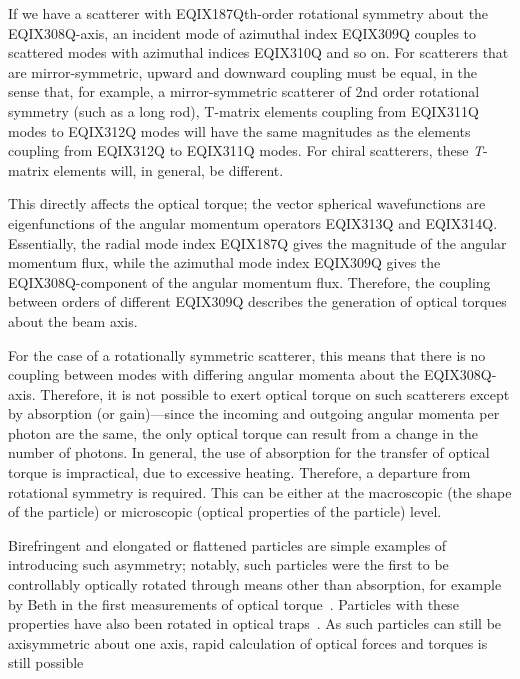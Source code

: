 If we have a scatterer with EQIX187Qth-order rotational symmetry about the
EQIX308Q-axis, an incident mode of azimuthal index EQIX309Q couples to scattered
modes with azimuthal indices EQIX310Q and so on. For
scatterers that are mirror-symmetric, upward and downward coupling must be
equal, in the sense that, for example, a mirror-symmetric scatterer of
2nd order rotational symmetry (such as a long rod), {T}-matrix elements
coupling from EQIX311Q modes to EQIX312Q modes will have the same magnitudes
as the elements coupling from EQIX312Q to EQIX311Q modes. For chiral
scatterers, these \textit{T}-matrix elements will, in general, be different.

This directly affects the optical torque; the vector spherical wavefunctions
are eigenfunctions of the angular momentum operators EQIX313Q and EQIX314Q.
Essentially, the radial mode index EQIX187Q gives the magnitude of the
angular momentum flux, while the azimuthal mode index EQIX309Q gives
the EQIX308Q-component of the angular momentum flux. Therefore, the coupling
between orders of different EQIX309Q describes the generation of optical
torques about the beam axis.

For the case of a rotationally symmetric scatterer, this means that there
is no coupling between modes with differing angular momenta about
the EQIX308Q-axis\cite{waterman1971,mishchenko1991,nieminen2004a}.
Therefore, it is not possible to exert optical torque on such scatterers
except by absorption (or gain)---since the incoming and outgoing
angular momenta
per photon are the same, the only optical torque can result from a change
in the number of photons. In general, the use of absorption for the
transfer of optical torque is impractical, due to excessive heating.
Therefore, a departure from rotational symmetry is required. This
can be either at the macroscopic (the shape of the particle) or
microscopic (optical properties of the particle) level.

Birefringent and elongated or flattened particles are simple
examples of introducing such asymmetry; notably, such particles were
the first to be controllably optically rotated through means other
than absorption, for example by Beth in the first measurements
of optical torque~\cite{beth1936}. Particles with these properties
have also been rotated in optical traps~\cite{friese1998nature,bonin2002,bayoudh2003,bishop2003}. As such particles can still
be axisymmetric about one axis, rapid calculation of optical
forces and torques is still possible~\cite{bayoudh2003,bishop2003}

